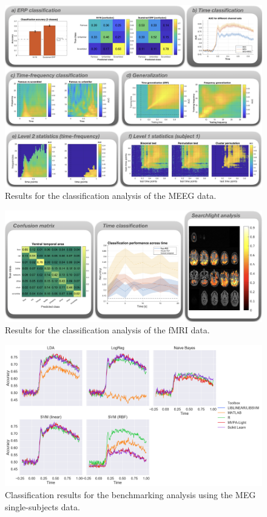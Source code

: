 \documentclass[utf8]{frontiersSCNS} %
\begin{document}
\begin{figure}[ht!]
\centering\includegraphics[width=\linewidth]{MVPA_results}
\caption{Results for the classification analysis of the \cite{Wakeman2015ADataset} MEEG data.}\label{fig:results}
\end{figure}

\begin{figure}[ht!]
\centering\includegraphics[width=\linewidth]{fmri_results}
\caption{Results for the classification analysis of the \cite{Haxby2001} fMRI data.}\label{fig:fmri_results}
\end{figure}

\begin{figure}[ht!]
\centering\includegraphics[width=\linewidth]{benchmark_classification}
\caption{Classification results for the benchmarking analysis using the MEG single-subjects data.}\label{fig:benchmarking}
\end{figure}
\end{document}
